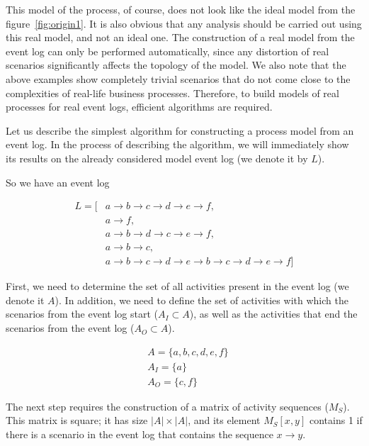 \documentclass[
11pt,%
tightenlines,%
twoside,%
onecolumn,%
nofloats,%
nobibnotes,%
nofootinbib,%
superscriptaddress,%
noshowpacs,%
centertags]%
{revtex4}
\begin{document}
This model of the process, of course, does not look like the ideal model from the figure~\ref{fig:origin1}.
It is also obvious that any analysis should be carried out using this real model, and not an ideal one.
The construction of a real model from the event log can only be performed automatically, since any distortion of real scenarios significantly affects the topology of the model.
We also note that the above examples show completely trivial scenarios that do not come close to the complexities of real-life business processes.
Therefore, to build models of real processes for real event logs, efficient algorithms are required.

Let us describe the simplest algorithm for constructing a process model from an event log.
In the process of describing the algorithm, we will immediately show its results on the already considered model event log (we denote it by $L$).

So we have an event log

\begin{equation}
\begin{aligned}
L = [
&{a \rightarrow b \rightarrow c \rightarrow d \rightarrow e \rightarrow f},\\
&{a \rightarrow f},\\
&{a \rightarrow b \rightarrow d \rightarrow c \rightarrow e \rightarrow f},\\
&{a \rightarrow b \rightarrow c},\\
&{a \rightarrow b \rightarrow c \rightarrow d \rightarrow e \rightarrow b \rightarrow c \rightarrow d \rightarrow e \rightarrow f}
]
\end{aligned}
\end{equation}

First, we need to determine the set of all activities present in the event log (we denote it $A$).
In addition, we need to define the set of activities with which the scenarios from the event log start ($A_I \subset A$), as well as the activities that end the scenarios from the event log ($A_O \subset A$).

\begin{equation}
\begin{aligned}
&A = \{a, b, c, d, e, f\} \\
&A_I = \{a\} \\
&A_O = \{c, f\}
\end{aligned}
\end{equation}

The next step requires the construction of a matrix of activity sequences ($M_S$).
This matrix is square; it has size $| A | \times | A |$, and its element $M_S[x, y]$ contains 1 if there is a scenario in the event log that contains the sequence $x \rightarrow y$.
\end{document}
